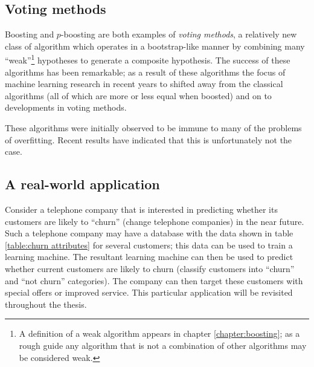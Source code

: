 \subsection{Voting methods}

Boosting and $p$-boosting are both examples of \emph{voting methods},
a relatively new class of algorithm which operates in a bootstrap-like
manner by combining many ``weak''\footnote{A definition of a weak
algorithm appears in chapter \ref{chapter:boosting}; as a rough guide any
algorithm that is not a combination of other algorithms may be
considered weak.} hypotheses to generate a composite hypothesis.  The
success of these algorithms has been remarkable; as a result of these
algorithms the focus of machine learning research in recent years to
shifted away from the classical algorithms (all of which are more or
less equal when boosted) and on to developments in voting methods.

These algorithms were initially observed to be immune to many of the
problems of overfitting.  Recent results have indicated that this is
unfortunately not the case.

\subsection{A real-world application}
\label{sec:churn example}

Consider a telephone company that is interested in predicting whether
its customers are likely to ``churn'' (change telephone companies) in
the near future.  Such a telephone company may have a database with
the data shown in table \ref{table:churn attributes} for several
customers; this data can be used to train a learning machine.  
The resultant learning machine can then be used to predict whether
current customers are likely to churn (classify customers into
``churn'' and ``not churn'' categories).  The company can then target
these customers with special offers or improved service.
This particular application will be revisited throughout the thesis.

